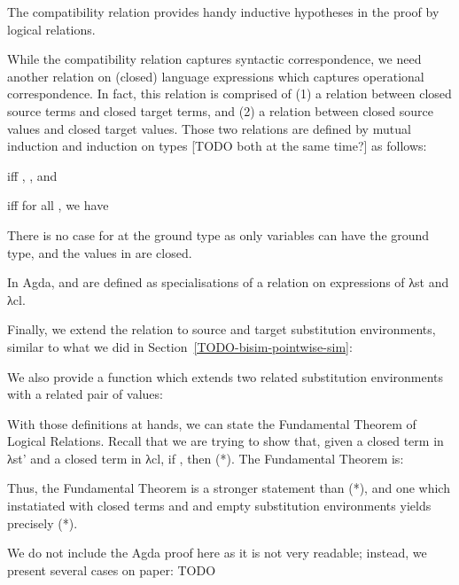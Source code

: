 \documentclass[bsc,frontabs,oneside,singlespacing,parskip,deptreport]{infthesis}
\theoremstyle{definition}
\begin{document}

The compatibility relation provides handy inductive hypotheses in the
proof by logical relations.

While the compatibility relation captures syntactic correspondence, we
need another relation on (closed) language expressions which captures
operational correspondence. In fact, this relation  is
comprised of (1) a relation \AS{\ti} between closed source terms and
closed target terms, and (2) a relation  between closed source
values and closed target values. Those two relations are defined by
mutual induction and induction on types [TODO both at the same time?]
as follows:

 iff , , and 

 iff for all , we have 

There is no case for  at the ground type  as only
variables can have the ground type, and the values in  are
closed.

In Agda, \AS{\ti} and  are defined as specialisations of a
relation  on expressions of λst and λcl. 


Finally, we extend the  relation to source and target
substitution environments, similar to what we did in
Section~\ref{TODO-bisim-pointwise-sim}:


We also provide a function  which extends two related
substitution environments with a related pair of values:


With those definitions at hands, we can state the Fundamental Theorem
of Logical Relations. Recall that we are trying to show that, given a
closed term  in λst' and a closed term  in λcl, if
, then  (*). The Fundamental Theorem is:


Thus, the Fundamental Theorem is a stronger statement than (*), and
one which instatiated with closed terms and and empty substitution
environments yields precisely (*).

We do not include the Agda proof here as it is not very readable;
instead, we present several cases on paper: TODO
\end{document}
